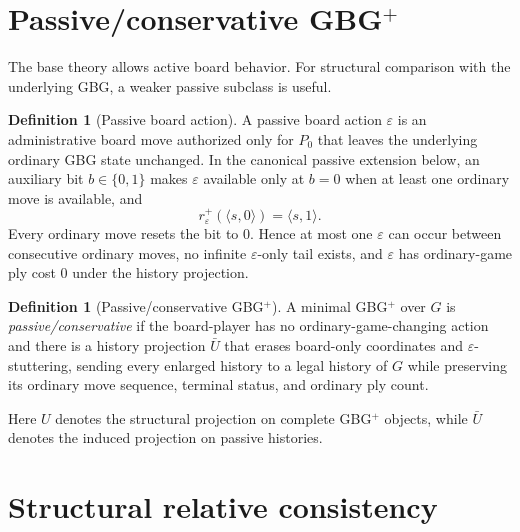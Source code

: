 \documentclass[11pt]{article}
\theoremstyle{definition}
\newtheorem{definition}[theorem]{Definition}
\theoremstyle{remark}
\begin{document}
\section{Passive/conservative \texorpdfstring{GBG$^{+}$}{GBG+}}

The base theory allows active board behavior.  For structural comparison with the underlying GBG, a weaker passive subclass is useful.

\begin{definition}[Passive board action]
A passive board action $\varepsilon$ is an administrative board move authorized only for $P_0$ that leaves the underlying ordinary GBG state unchanged.  In the canonical passive extension below, an auxiliary bit $b\in\{0,1\}$ makes $\varepsilon$ available only at $b=0$ when at least one ordinary move is available, and
\[
r_\varepsilon^{+}(\langle s,0\rangle)=\langle s,1\rangle.
\]
Every ordinary move resets the bit to $0$.  Hence at most one $\varepsilon$ can occur between consecutive ordinary moves, no infinite $\varepsilon$-only tail exists, and $\varepsilon$ has ordinary-game ply cost $0$ under the history projection.
\end{definition}

\begin{definition}[Passive/conservative GBG$^{+}$]
A minimal GBG$^{+}$ over $G$ is \emph{passive/conservative} if the board-player has no ordinary-game-changing action and there is a history projection $\bar U$ that erases board-only coordinates and $\varepsilon$-stuttering, sending every enlarged history to a legal history of $G$ while preserving its ordinary move sequence, terminal status, and ordinary ply count.
\end{definition}

Here $U$ denotes the structural projection on complete GBG$^{+}$ objects, while $\bar U$ denotes the induced projection on passive histories.

\section{Structural relative consistency}
\end{document}
